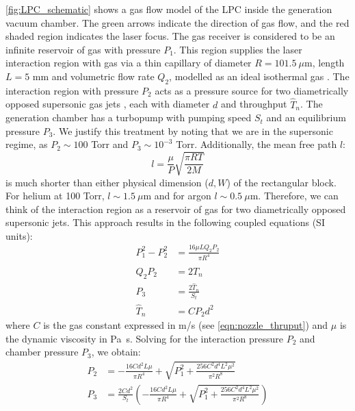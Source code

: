 \cref{fig:LPC_schematic} shows a gas flow model of the LPC inside the generation vacuum chamber. The green arrows indicate the direction of gas flow, and the red shaded region indicates the laser focus. The gas receiver is considered to be an infinite reservoir of gas with pressure $P_1$. This region supplies the laser interaction region with gas via a thin capillary of diameter $R = 101.5 \ \mu \textrm{m}$, length $L = 5 \textrm{ mm}$ and volumetric flow rate $Q_2$, modelled as an ideal isothermal gas \cite{fryerTheoryGasFlow1966,venerusLaminarCapillaryFlow2006,landauFluidMechanics2011}. The interaction region with pressure $P_2$ acts as a pressure source for two diametrically opposed supersonic gas jets \cite{millerFreeJetSources1988}, each with diameter $d$ and throughput $\hat{T}_{n}$. The generation chamber has a turbopump with pumping speed $S_{t}$ and an equilibrium pressure $P_3$. We justify this treatment by noting that we are in the supersonic regime, as $P_2 \sim 100$ Torr and $P_3 \sim 10^{-3}$ Torr. Additionally, the mean free path $l$:
\begin{equation}
l = \frac{\mu}{P} \sqrt{\frac{\pi R T}{2 M}}
\end{equation}
is much shorter than either physical dimension ($d, W$) of the rectangular block. For helium at 100 Torr, $l \sim 1.5 \ \mu \textrm{m}$ and for argon  $l \sim 0.5 \ \mu \textrm{m}$. Therefore, we can think of the interaction region as a reservoir of gas for two diametrically opposed supersonic jets. This approach results in the following coupled equations (SI units):
\begin{align}
P_1^2 - P_2^2 &= \frac{16 \mu L Q_2 P_2}{\pi R^4} \\
Q_2 P_2 &= 2 \hat{T}_n \\
P_3 &= \frac{2 \hat{T}_n}{S_t} \\
\hat{T}_n &= C P_2 d^2
\label{eqn:LPC_coupled_equations}
\end{align}
where $C$ is the gas constant expressed in \si{m/s} (see \cref{eqn:nozzle_thruput}) and $\mu$ is the dynamic viscosity in \si{Pa.s}. Solving for the interaction pressure $P_2$ and chamber pressure $P_3$, we obtain:
\begin{align}
P_2 &= - \frac{16 C d^2 L \mu}{\pi R^4} + \sqrt{P_1^2 + \frac{256 C^2 d^4 L^2 \mu^2}{\pi^2 R^8}} \\
P_3 &= \frac{2 C d^2}{S_t} \left( - \frac{16 C d^2 L \mu}{\pi R^4} + \sqrt{P_1^2 + \frac{256 C^2 d^4 L^2 \mu^2}{\pi^2 R^8}}  \right)
\label{eqn:LPC_pressures}
\end{align}

